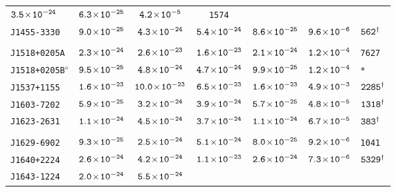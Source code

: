 \begin{longtable}{ l | c | c | c | c | c | l }
\scriptsize{$\tt{3.5\!\times\!10^{-24}}$} &\scriptsize{$\tt{6.3\!\times\!10^{-25}}$} & \scriptsize{$\tt{4.2\!\times\!10^{-5}}$} &
\scriptsize{\tt{1574}} \\[-16pt] 
\scriptsize{\tt{J1455-3330}} & \scriptsize{$\tt{9.0\!\times\!10^{-25}}$} & \scriptsize{$\tt{4.3\!\times\!10^{-24}}$} &
\scriptsize{$\tt{5.4\!\times\!10^{-24}}$} & \scriptsize{$\tt{8.6\!\times\!10^{-25}}$} & \scriptsize{$\tt{9.6\!\times\!10^{-6}}$} &
\scriptsize{$\tt{562^{\dagger}}$} \\[-16pt] 
\\[-20pt] 
\scriptsize{\tt{J1518+0205A}} & \scriptsize{$\tt{2.3\!\times\!10^{-24}}$} & \scriptsize{$\tt{2.6\!\times\!10^{-23}}$} &
\scriptsize{$\tt{1.6\!\times\!10^{-23}}$} &\scriptsize{$\tt{2.1\!\times\!10^{-24}}$} & \scriptsize{$\tt{1.2\!\times\!10^{-4}}$} &
\scriptsize{\tt{7627}} \\[-16pt] 
\scriptsize{\tt{J1518+0205B}$^{\diamond}$} & \scriptsize{$\tt{9.5\!\times\!10^{-25}}$} &
\scriptsize{$\tt{4.8\!\times\!10^{-24}}$} & \scriptsize{$\tt{4.7\!\times\!10^{-24}}$} & \scriptsize{$\tt{9.9\!\times\!10^{-25}}$}
& \scriptsize{$\tt{1.2\!\times\!10^{-4}}$} & \scriptsize{\tt{*}} \\[-16pt] 
\scriptsize{\tt{J1537+1155}} & \scriptsize{$\tt{1.6\!\times\!10^{-23}}$} & \scriptsize{$\tt{10.0\!\times\!10^{-23}}$} &
\scriptsize{$\tt{6.5\!\times\!10^{-23}}$} & \scriptsize{$\tt{1.6\!\times\!10^{-23}}$} & \scriptsize{$\tt{4.9\!\times\!10^{-3}}$} &
\scriptsize{$\tt{2285^{\dagger}}$} \\[-16pt] 
\scriptsize{\tt{J1603-7202}} & \scriptsize{$\tt{5.9\!\times\!10^{-25}}$} &
\scriptsize{$\tt{3.2\!\times\!10^{-24}}$} & \scriptsize{$\tt{3.9\!\times\!10^{-24}}$} &
\scriptsize{$\tt{5.7\!\times\!10^{-25}}$} & \scriptsize{$\tt{4.8\!\times\!10^{-5}}$} &
\scriptsize{$\tt{1318^{\dagger}}$} \\[-16pt] 
\scriptsize{\tt{J1623-2631}} & \scriptsize{$\tt{1.1\!\times\!10^{-24}}$} & \scriptsize{$\tt{4.5\!\times\!10^{-24}}$} &
\scriptsize{$\tt{3.7\!\times\!10^{-24}}$} & \scriptsize{$\tt{1.1\!\times\!10^{-24}}$} & \scriptsize{$\tt{6.7\!\times\!10^{-5}}$} &
\scriptsize{$\tt{383^{\dagger}}$} \\[-16pt] 
\\[-20pt] 
\scriptsize{\tt{J1629-6902}} & \scriptsize{$\tt{9.3\!\times\!10^{-25}}$} & \scriptsize{$\tt{2.5\!\times\!10^{-24}}$} &
\scriptsize{$\tt{5.1\!\times\!10^{-24}}$} &\scriptsize{$\tt{8.0\!\times\!10^{-25}}$} & \scriptsize{$\tt{9.2\!\times\!10^{-6}}$} &
\scriptsize{\tt{1041}} \\[-16pt] 
\scriptsize{\tt{J1640+2224}} & \scriptsize{$\tt{2.6\!\times\!10^{-24}}$} & \scriptsize{$\tt{4.2\!\times\!10^{-24}}$} &
\scriptsize{$\tt{1.1\!\times\!10^{-23}}$} & \scriptsize{$\tt{2.6\!\times\!10^{-24}}$} & \scriptsize{$\tt{7.3\!\times\!10^{-6}}$} &
\scriptsize{$\tt{5329^{\dagger}}$} \\[-16pt] 
\scriptsize{\tt{J1643-1224}} & \scriptsize{$\tt{2.0\!\times\!10^{-24}}$} & \scriptsize{$\tt{5.5\!\times\!10^{-24}}$} &

\end{longtable}
